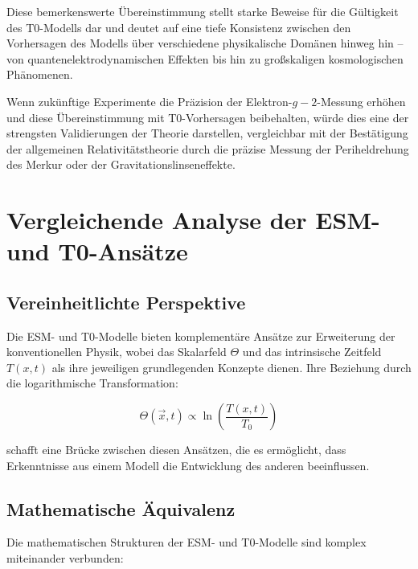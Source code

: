 \documentclass[12pt,a4paper]{article}
\newcommand{\Tfieldt}{T(x,t)}
\newcommand{\Tzero}{T_0}
\newcommand{\vecx}{\vec{x}}
\begin{document}
	Diese bemerkenswerte Übereinstimmung stellt starke Beweise für die Gültigkeit des T0-Modells dar und deutet auf eine tiefe Konsistenz zwischen den Vorhersagen des Modells über verschiedene physikalische Domänen hinweg hin – von quantenelektrodynamischen Effekten bis hin zu großskaligen kosmologischen Phänomenen.
	
	Wenn zukünftige Experimente die Präzision der Elektron-$g-2$-Messung erhöhen und diese Übereinstimmung mit T0-Vorhersagen beibehalten, würde dies eine der strengsten Validierungen der Theorie darstellen, vergleichbar mit der Bestätigung der allgemeinen Relativitätstheorie durch die präzise Messung der Periheldrehung des Merkur oder der Gravitationslinseneffekte.
	
	\section{Vergleichende Analyse der ESM- und T0-Ansätze}
	\label{sec:comparison}
	
	\subsection{Vereinheitlichte Perspektive}
	\label{subsec:unified_perspective}
	
	Die ESM- und T0-Modelle bieten komplementäre Ansätze zur Erweiterung der konventionellen Physik, wobei das Skalarfeld $\Theta$ und das intrinsische Zeitfeld $\Tfieldt$ als ihre jeweiligen grundlegenden Konzepte dienen. Ihre Beziehung durch die logarithmische Transformation:
	
	\begin{equation}
		\Theta(\vecx,t) \propto \ln\left(\frac{\Tfieldt}{\Tzero}\right)
		\label{eq:log_transform}
	\end{equation}
	
	schafft eine Brücke zwischen diesen Ansätzen, die es ermöglicht, dass Erkenntnisse aus einem Modell die Entwicklung des anderen beeinflussen.
	
	\subsection{Mathematische Äquivalenz}
	\label{subsec:math_equivalence}
	
	Die mathematischen Strukturen der ESM- und T0-Modelle sind komplex miteinander verbunden:
	
\end{document}
